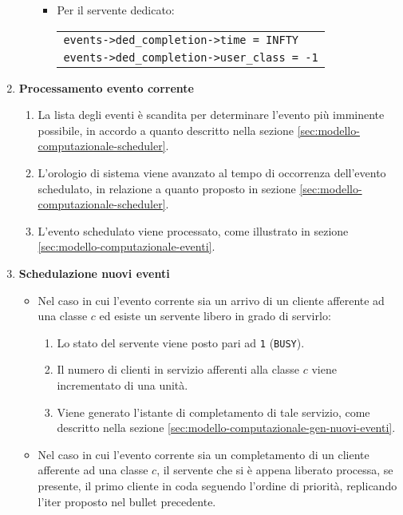 \begin{enumerate}[label=Step \arabic*), align=left, leftmargin=*]
\begin{itemize}
\begin{itemize}
\item Per il servente dedicato:
\begin{center}
\begin{tabular}{l}
\texttt{events->ded\_completion->time = INFTY} \\
\texttt{events->ded\_completion->user\_class = -1}
\end{tabular}
\end{center}
\end{itemize}
\end{itemize}
\item \textbf{Processamento evento corrente}
\begin{enumerate}
\item La lista degli eventi è scandita per determinare l'evento più imminente possibile, in accordo a quanto descritto nella sezione \ref{sec:modello-computazionale-scheduler}.
\item L'orologio di sistema viene avanzato al tempo di occorrenza dell'evento schedulato, in relazione a quanto proposto in sezione \ref{sec:modello-computazionale-scheduler}.
\item L'evento schedulato viene processato, come illustrato in sezione \ref{sec:modello-computazionale-eventi}.
\end{enumerate}
\item \textbf{Schedulazione nuovi eventi}
\begin{itemize}
\item Nel caso in cui l'evento corrente sia un arrivo di un cliente afferente ad una classe $c$ ed esiste un servente libero in grado di servirlo:
\begin{enumerate}
\item Lo stato del servente viene posto pari ad \texttt{1} (\texttt{BUSY}).
\item Il numero di clienti in servizio afferenti alla classe $c$ viene incrementato di una unità.
\item Viene generato l'istante di completamento di tale servizio, come descritto nella sezione \ref{sec:modello-computazionale-gen-nuovi-eventi}.
\end{enumerate}

\item Nel caso in cui l'evento corrente sia un completamento di un cliente afferente ad una classe $c$, il servente che si è appena liberato processa, se presente, il primo cliente in coda seguendo l'ordine di priorità, replicando l'iter proposto nel bullet precedente.
\end{itemize}


\end{enumerate}

